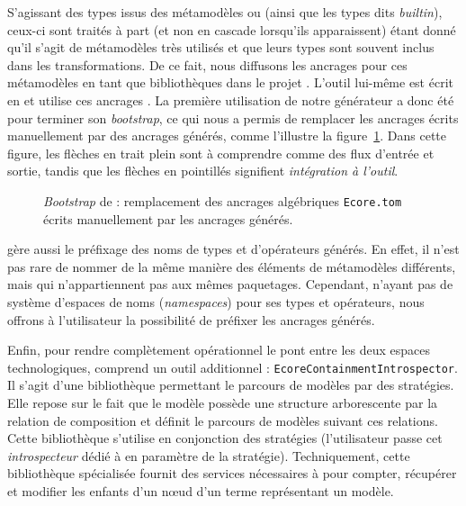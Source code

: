 S'agissant des types issus des métamodèles {\ecore} ou {\uml} (ainsi que les
types dits \emph{builtin}), ceux-ci sont traités à part (et non en cascade
lorsqu'ils apparaissent) étant donné qu'il s'agit de métamodèles très utilisés
et que leurs types sont souvent inclus dans les transformations. De ce fait,
nous diffusons les ancrages pour ces métamodèles en tant que bibliothèques dans
le projet {\tom}. L'outil {\tomemf} lui-même est écrit en {\tomjava} et utilise
ces ancrages {\ecore}. La première utilisation de notre générateur a donc été
pour terminer son \emph{bootstrap}, ce qui nous a permis de remplacer les
ancrages écrits manuellement par des ancrages générés, comme l'illustre la
figure~\ref{fig:bootstrapTomEMF}. Dans cette figure, les flèches en trait plein
sont à comprendre comme des flux d'entrée et sortie, tandis que les flèches en
pointillés signifient \emph{intégration à l'outil}.


\begin{figure}[h]
  \begin{center}
    
  \end{center}
  \caption{\emph{Bootstrap} de {\tomemf} : remplacement des ancrages algébriques \texttt{Ecore.tom} écrits manuellement par les ancrages générés.}
  \label{fig:bootstrapTomEMF}
\end{figure}


{\tomemf} gère aussi le préfixage des noms de types et d'opérateurs générés. En
effet, il n'est pas rare de nommer de la même manière des éléments de
métamodèles différents, mais qui n'appartiennent pas aux mêmes paquetages.
Cependant, {\tom} n'ayant pas de système d'espaces de noms (\emph{namespaces})
pour ses types et opérateurs, nous offrons à l'utilisateur la possibilité de
préfixer les ancrages générés.


Enfin, pour rendre complètement opérationnel le pont entre les deux espaces
technologiques, {\tomemf} comprend un outil additionnel :
\texttt{EcoreContainmentIntrospector}. Il s'agit d'une bibliothèque permettant
le parcours de modèles par des stratégies. Elle repose sur le fait que le
modèle possède une structure arborescente par la relation de composition et
définit le parcours de modèles suivant ces relations. Cette bibliothèque
s'utilise en conjonction des stratégies (l'utilisateur passe cet
\emph{introspecteur} dédié à {\ecore} en paramètre de la stratégie).
Techniquement, cette bibliothèque spécialisée fournit des services nécessaires
à {\tom} pour compter, récupérer et modifier les enfants d'un nœud d'un terme
représentant un modèle.


